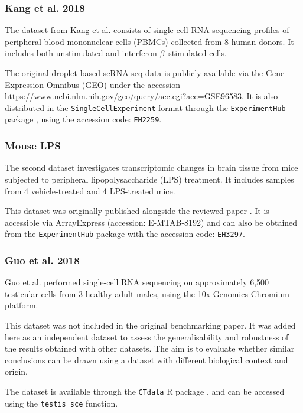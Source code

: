 \documentclass[a4paper, 11pt, twocolumn]{article}
\begin{document}
\begin{multicols}{2}
\subsubsection{Kang et al. 2018}

The dataset from Kang et al. \citep{kang_multiplexed_2018} consists of single-cell RNA-sequencing profiles of peripheral blood mononuclear cells (PBMCs) collected from 8 human donors. It includes both unstimulated and interferon-$\beta$–stimulated cells.

The original droplet-based scRNA-seq data is publicly available via the Gene Expression Omnibus (GEO) under the accession \url{https://www.ncbi.nlm.nih.gov/geo/query/acc.cgi?acc=GSE96583}. It is also distributed in the \texttt{SingleCellExperiment} format \citep{sce} through the \texttt{ExperimentHub} package \citep{ExperimentHub}, using the accession code: \texttt{EH2259}.

\subsubsection{Mouse LPS}

The second dataset investigates transcriptomic changes in brain tissue from mice subjected to peripheral lipopolysaccharide (LPS) treatment. It includes samples from 4 vehicle-treated and 4 LPS-treated mice.

This dataset was originally published alongside the reviewed paper \citep{crowell2020muscat}. It is accessible via ArrayExpress (accession: E-MTAB-8192) and can also be obtained from the \texttt{ExperimentHub} package \citep{ExperimentHub} with the accession code: \texttt{EH3297}.

\subsubsection{Guo et al. 2018}

Guo et al. \citep{guo_adult_2018} performed single-cell RNA sequencing on approximately 6,500 testicular cells from 3 healthy adult males, using the 10x Genomics Chromium platform.

This dataset was not included in the original benchmarking paper. It was added here as an independent dataset to assess the generalisability and robustness of the results obtained with other datasets. The aim is to evaluate whether similar conclusions can be drawn using a dataset with different biological context and origin.

The dataset is available through the \texttt{CTdata} R package \citep{CTdata}, and can be accessed using the \texttt{testis\_sce} function.



\end{multicols}
\end{document}
